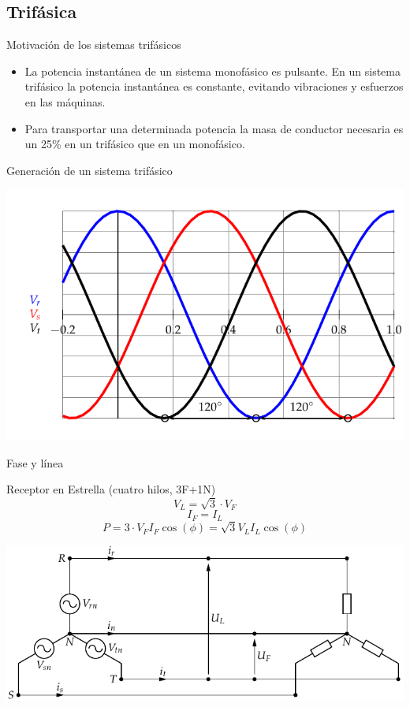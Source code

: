 \documentclass[xcolor={usenames,svgnames,dvipsnames}]{beamer}
\begin{document}
\subsection{Trifásica}
\label{sec:org62ed3be}

\begin{frame}[label={sec:org3028e93}]{Motivación de los sistemas trifásicos}
\begin{itemize}
\item La potencia instantánea de un sistema monofásico es pulsante. En un
sistema trifásico la potencia instantánea es constante, evitando
vibraciones y esfuerzos en las máquinas.

\item Para transportar una determinada potencia la masa de conductor
necesaria es un 25\% en un trifásico que en un monofásico.
\end{itemize}
\end{frame}

\begin{frame}[label={sec:org2ef9120}]{Generación de un sistema trifásico}
\begin{center}
\includegraphics[width=.9\linewidth]{../figs/TensionesTrifasica.pdf}
\end{center}
\end{frame}

\begin{frame}[label={sec:org8547a56}]{Fase y línea}
\begin{block}{Receptor en Estrella (cuatro hilos, 3F+1N)}
$$V_{L}=\sqrt{3}\cdot V_{F}$$ $$I_{F}=I_{L}$$
$$P=3\cdot V_{F}I_{F}\cos(\phi)=\sqrt{3}V_{L}I_{L}\cos(\phi)$$
\begin{center}
\includegraphics[width=.9\linewidth]{../figs/RedTrifasicaEstrella.pdf}
\end{center}
\end{block}
\end{frame}
\end{document}
